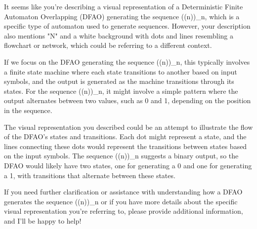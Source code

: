 It seems like you're describing a visual representation of a Deterministic Finite Automaton Overlapping (DFAO) generating the sequence ((n))_n, which is a specific type of automaton used to generate sequences. However, your description also mentions "N" and a white background with dots and lines resembling a flowchart or network, which could be referring to a different context.

If we focus on the DFAO generating the sequence ((n))_n, this typically involves a finite state machine where each state transitions to another based on input symbols, and the output is generated as the machine transitions through its states. For the sequence ((n))_n, it might involve a simple pattern where the output alternates between two values, such as 0 and 1, depending on the position in the sequence.

The visual representation you described could be an attempt to illustrate the flow of the DFAO's states and transitions. Each dot might represent a state, and the lines connecting these dots would represent the transitions between states based on the input symbols. The sequence ((n))_n suggests a binary output, so the DFAO would likely have two states, one for generating a 0 and one for generating a 1, with transitions that alternate between these states.

If you need further clarification or assistance with understanding how a DFAO generates the sequence ((n))_n or if you have more details about the specific visual representation you're referring to, please provide additional information, and I'll be happy to help!